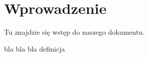 \section{Wprowadzenie}
\label{sec:wprowadzenie}

Tu znajdzie się wstęp do naszego dokumentu.

\begin{defn}
bla bla bla definicja
\end{defn}

